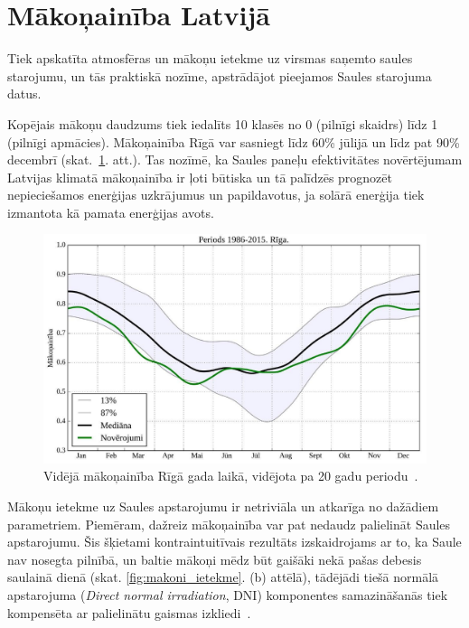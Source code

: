 \section{Mākoņainība Latvijā}

Tiek apskatīta atmosfēras un mākoņu ietekme uz virsmas saņemto saules starojumu, un tās praktiskā nozīme, apstrādājot pieejamos Saules starojuma datus.

Kopējais mākoņu daudzums tiek iedalīts 10 klasēs no 0 (pilnīgi skaidrs) līdz 1 (pilnīgi apmācies). Mākoņainība Rīgā var sasniegt līdz 60\% jūlijā un līdz pat 90\% decembrī (skat.~\ref{fig:makoni_Riga}. att.). Tas nozīmē, ka Saules paneļu efektivitātes novērtējumam Latvijas klimatā mākoņainība ir ļoti būtiska un tā palīdzēs prognozēt nepieciešamos enerģijas uzkrājumus un papildavotus, ja solārā enerģija tiek izmantota kā pamata enerģijas avots.
\begin{figure}[h]
	\centering
	\includegraphics[width=0.8\linewidth]{figures/misc/makoni_riga.jpg}
	\caption{Vidējā mākoņainība Rīgā gada laikā, vidējota pa 20 gadu periodu~\cite{cloudsModlab}.}
	\label{fig:makoni_Riga}
\end{figure}

Mākoņu ietekme uz Saules apstarojumu ir netriviāla un atkarīga no dažādiem parametriem. Piemēram, dažreiz mākoņainība var pat nedaudz palielināt Saules apstarojumu. Šis šķietami kontraintuitīvais rezultāts izskaidrojams ar to, ka Saule nav nosegta pilnībā, un baltie mākoņi mēdz būt gaišāki nekā pašas debesis saulainā dienā (skat. \ref{fig:makoni_ietekme}. (b) attēlā), tādējādi tiešā normālā apstarojuma (\textit{Direct normal irradiation}, DNI) komponentes samazināšanās tiek kompensēta ar palielinātu gaismas izkliedi~\cite{CloudCoverageImpactOnIrradiance}. 

